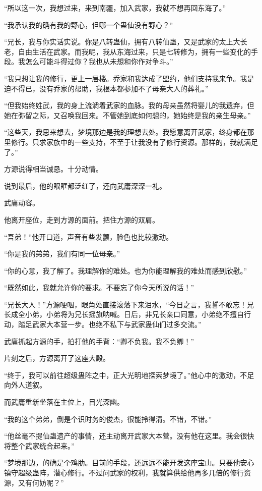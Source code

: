 \begin{this_body}
“所以这一次，我想过来，来到南疆，加入武家，我就不想再回东海了。”

“我承认我的确有我的野心，但哪一个蛊仙没有野心？”

“兄长，我与你实话实说。你是八转蛊仙，拥有八转仙蛊，又是武家的太上大长老，自由生活在武家。而我呢，我从东海过来，只是七转修为，拥有一些变化的手段。我怎么可能斗得过你？我也从未想和你作对争斗。”

“我只想让我的修行，更上一层楼。乔家和我达成了盟约，他们支持我来争。我是迫不得已，没有乔家的帮助，我根本都参加不了母亲大人的葬礼。”

“但我始终姓武，我的身上流淌着武家的血脉。我的母亲虽然将婴儿的我遗弃，但她在弥留之际，又召唤我回来。不管她到底如何想的，她始终是我的亲生母亲。”

“这些天，我思来想去，梦境那边是我的理想去处。我愿意离开武家，终身都在那里修行。只求家族中的一些支持，不至于让我没有了修行资源。那样的，我就满足了。”

方源说得相当诚恳。十分动情。

说到最后，他的眼眶都泛红了，还向武庸深深一礼。

武庸动容。

他离开座位，走到方源的面前。把住方源的双肩。

“吾弟！”他开口道，声音有些发颤，脸色也比较激动。

“你是我的弟弟，我们有同一位母亲。”

“你的心意，我了解了。我理解你的难处。也为你能理解我的难处而感到欣慰。”

“既然如此，我就允许你的要求。不要忘了你今天所说的话！”

“兄长大人！”方源哽咽，眼角处直接滚落下来泪水，“今日之言，我誓不敢忘！兄长成全小弟，小弟将为兄长摇旗呐喊。日后，非兄长亲口同意，小弟绝不擅自行动，踏足武家大本营一步。也绝不私下与武家蛊仙们过多交流。”

武庸抓起方源的手，拍打他的手背：“卿不负我。我不负卿！”

片刻之后，方源离开了这座大殿。

“终于，我可以前往超级蛊阵之中，正大光明地探索梦境了。”他心中的激动，不足向外人道叙。

而武庸重新坐落在主位上，目光深幽。

“我的这个弟弟，倒是个识时务的俊杰，很能拎得清。不错，不错。”

“他丝毫不提仙蛊遗产的事情，还主动离开武家大本营。没有他在这里。我会很快将整个武家统合起来。”

“梦境那边，的确是个鸡肋。目前的手段，还远远不能开发这座宝山。只要他安心镇守超级蛊阵，潜心修行。不过问武家的权利，我就算供给他再多几倍的修行资源，又有何妨呢？”


\end{this_body}
